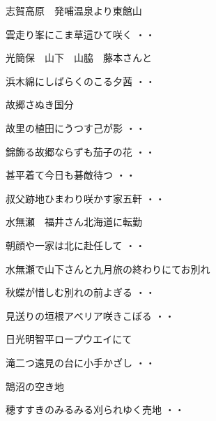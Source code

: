 \vspace{0.6cm}
志賀高原　発哺温泉より東館山
\begin{shiika}雲走り峯にこま草這ひて咲く
\hfill{・・}\end{shiika}
\vspace{0.6cm}
光簡保　山下　山脇　藤本さんと
\begin{shiika}浜木綿にしばらくのこる夕茜
\hfill{・・}\end{shiika}
\vspace{0.6cm}
故郷さぬき国分
\begin{shiika}故里の植田にうつす己が影
\hfill{・・}\end{shiika}
\begin{shiika}錦飾る故郷ならずも茄子の花
\hfill{・・}\end{shiika}
\begin{shiika}甚平着て今日も碁敵待つ
\hfill{・・}\end{shiika}
\begin{shiika}叔父跡地ひまわり咲かす家五軒
\hfill{・・}\end{shiika}
\vspace{0.6cm}
水無瀬　福井さん北海道に転勤
\begin{shiika}朝顔や一家は北に赴任して
\hfill{・・}\end{shiika}
\vspace{0.6cm}
水無瀬で山下さんと九月旅の終わりにてお別れ
\begin{shiika}秋蝶が惜しむ別れの前よぎる
\hfill{・・}\end{shiika}
\vspace{0.6cm}
\begin{shiika}見送りの垣根アベリア咲きこぼる
\hfill{・・}\end{shiika}
\vspace{0.6cm}
日光明智平ロープウエイにて
\begin{shiika}滝二つ遠見の台に小手かざし
\hfill{・・}\end{shiika}
\vspace{0.6cm}
鵠沼の空き地
\begin{shiika}穂すすきのみるみる刈られゆく売地
\hfill{・・}\end{shiika}
